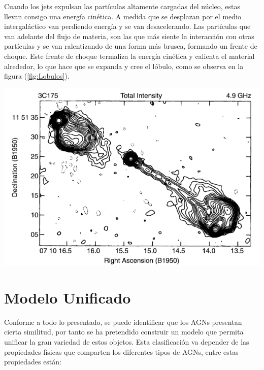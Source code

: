 Cuando los jets expulsan las partículas altamente cargadas del núcleo, estas llevan consigo una energía cinética. A medida que se desplazan por el medio intergaláctico van perdiendo energía y se van desacelerando. Las partículas que van adelante del flujo de materia, son las que más siente la interacción con otras partículas y se van ralentizando de una forma más brusca, formando un frente de choque. Este frente de choque termaliza la energía cinética y calienta el material alrededor, lo que hace que se expanda y cree el lóbulo,
como se observa en la figura (\ref{fig:Lobulos}).

\begin{center}
\includegraphics[scale=.3]{./figures/3_AGNs/Lobulos_y_Jets.png}
\label{fig:Lobulos}
\end{center}

\section{Modelo Unificado}
\label{sec:Unified_models}

Conforme a todo lo presentado, se puede identificar que los AGNs presentan cierta similitud, por tanto se ha pretendido construir un modelo que permita unificar la gran variedad de estos objetos. 
Esta clasificación va depender de las propiedades físicas que comparten los diferentes tipos de AGNs, entre estas propiedades están:  

